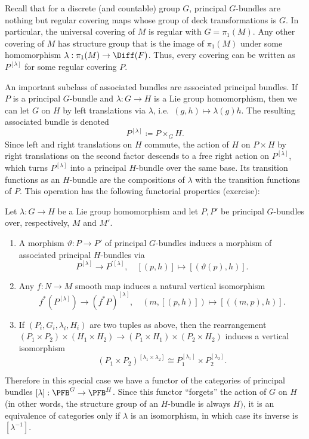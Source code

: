 \begin{example}
    Recall that for a discrete (and countable) group $G$, principal $G$-bundles are nothing but regular covering maps whose group of deck transformations is $G$. In particular, the universal covering of $M$ is regular with $G=\pi_1(M)$. Any other covering of $M$ has structure group that is the image of $\pi_1(M)$ under some homomorphism $\lambda:\pi_1(M)\to \Diff(F)$. Thus, every covering can be written as $P^{[\lambda]}$ for some regular covering $P$.
\end{example}



An important subclass of associated bundles are associated principal bundles. If $P$ is a principal $G$-bundle and $\lambda:G\to H$ is a Lie group homomorphism, then we can let $G$ on $H$ by left translations via $\lambda$, i.e.\ $(g,h)\mapsto \lambda(g)h$. The resulting associated bundle is denoted
\[\boxed{P^{[\lambda]}\coloneqq P\times_G H.}\]
Since left and right translations on $H$ commute, the action of $H$ on $P\times H$ by right translations on the second factor descends to a free right action on $P^{[\lambda]}$, which turns $P^{[\lambda]}$ into a principal $H$-bundle over the same base. Its transition functions as an $H$-bundle are the compositions of $\lambda$ with the transition functions of $P$. This operation has the following functorial properties (exercise):
\begin{prop}
    Let $\lambda:G\to H$ be a Lie group homomorphism and let $P,P'$ be principal $G$-bundles over, respectively, $M$ and $M'$.
    \begin{enumerate}
        \item A morphism $\vartheta:P\to P'$ of principal $G$-bundles induces a morphism of associated principal $H$-bundles via
        \[P^{[\lambda]}\to P^{\prime[\lambda]},\quad [(p,h)]\mapsto \left[\left(\vartheta(p),h\right)\right].\]
        \item Any $f:N\to M$ smooth map induces a natural vertical isomorphism
        \[f^\ast\left(P^{[\lambda]}\right)\to (f^\ast P)^{[\lambda]},\quad \left(m,[(p,h)]\right)\mapsto \left[\left((m,p),h\right)\right].\]
        \item If $(P_i,G_i,\lambda_i,H_i)$ are two tuples as above, then the rearrangement $(P_1\times P_2)\times(H_1\times H_2)\to (P_1\times H_1)\times(P_2\times H_2)$ induces a vertical isomorphism
        \[\left(P_1\times P_2\right)^{[\lambda_1\times\lambda_2]}\cong P_1^{[\lambda_1]}\times P_2^{[\lambda_2]}.\]
    \end{enumerate}
\end{prop}
Therefore in this special case we have a functor of the categories of principal bundles $[\lambda]:\PFB^G\to \PFB^H$. Since this functor ``forgets'' the action of $G$ on $H$ (in other words, the structure group of an $H$-bundle is always $H)$, it is an equivalence of categories only if $\lambda$ is an isomorphism, in which case its inverse is $[\lambda^{-1}]$.


